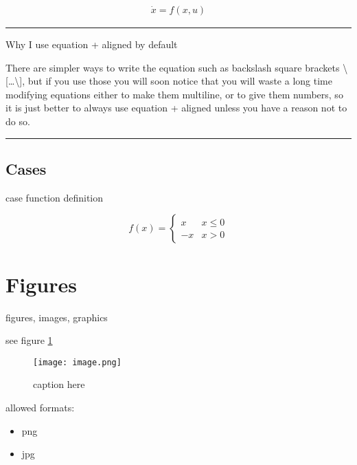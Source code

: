 \documentclass[12pt]{article}
\newcommand{\inOut}[1]{#1}                                %
\begin{document}
    \begin{example} \label{expFor1}
        \inOut{
            \begin{equation}\begin{aligned}\label{eqFor1}
                \dot{x} = f(x,u)
            \end{aligned}\end{equation}
        }
    \end{example}\hrule

    \begin{remark}\label{remFor1} Why I use equation + aligned by default

        There are simpler ways to write the equation such as backslash square brackets \textbackslash{}[\ldots\textbackslash{}],
        but if you use those you will soon notice that you will waste a long time modifying equations
        either to make them multiline, or to give them numbers, so it is just better to always use
        equation + aligned unless you have a reason not to do so.
    \end{remark}\hrule

\subsection{Cases}\label{cases}

    case function definition

    \begin{equation}
    f(x) =
    \begin{cases}
        x & x \le 0 \\
        -x & x>0
    \end{cases}
    \end{equation}

\section{Figures}\label{secTab}

    figures, images, graphics

    see figure \ref{fig-label}

    \begin{figure}[htb]
        \centering
        \texttt{[image: image.png]}
        \caption{caption here}
        \label{fig-label}
    \end{figure}

    allowed formats:

    \begin{itemize}
        \item png
        \item jpg
    \end{itemize}
\end{document}

